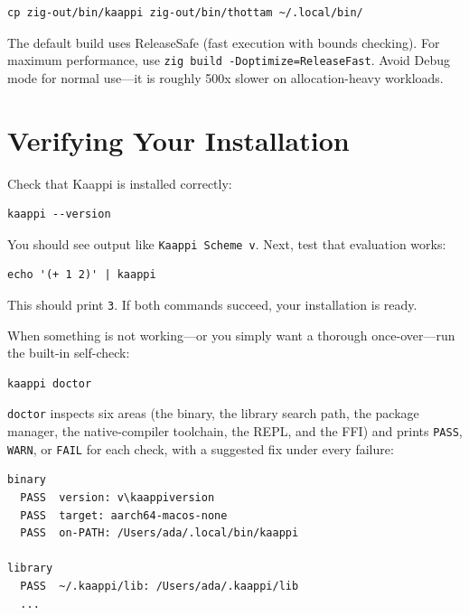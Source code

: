 \begin{Verbatim}[fontsize=\small]
cp zig-out/bin/kaappi zig-out/bin/thottam ~/.local/bin/
\end{Verbatim}

\begin{note}
The default build uses ReleaseSafe (fast execution with bounds checking). For maximum performance, use \texttt{zig build -Doptimize=ReleaseFast}. Avoid Debug mode for normal use---it is roughly 500x slower on allocation-heavy workloads.
\end{note}

\section{Verifying Your Installation}

Check that Kaappi is installed correctly:

\begin{Verbatim}[fontsize=\small]
kaappi --version
\end{Verbatim}

You should see output like \texttt{Kaappi Scheme v\kaappiversion}. Next, test that evaluation works:

\begin{Verbatim}[fontsize=\small]
echo '(+ 1 2)' | kaappi
\end{Verbatim}

This should print \texttt{3}. If both commands succeed, your installation is ready.

When something is not working---or you simply want a thorough once-over---run the built-in self-check:

\begin{Verbatim}[fontsize=\small]
kaappi doctor
\end{Verbatim}

\texttt{doctor} inspects six areas (the binary, the library search path, the package manager, the native-compiler toolchain, the REPL, and the FFI) and prints \texttt{PASS}, \texttt{WARN}, or \texttt{FAIL} for each check, with a suggested fix under every failure:

\begin{Verbatim}[fontsize=\small, commandchars=\\\{\}]
binary
  PASS  version: v\kaappiversion
  PASS  target: aarch64-macos-none
  PASS  on-PATH: /Users/ada/.local/bin/kaappi

library
  PASS  ~/.kaappi/lib: /Users/ada/.kaappi/lib
  ...
\end{Verbatim}

